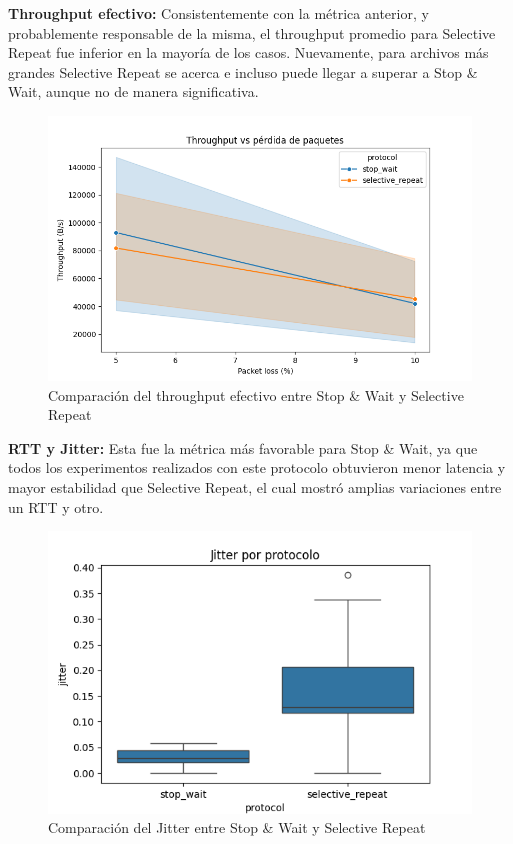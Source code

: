 \textbf{Throughput efectivo:}
Consistentemente con la métrica anterior, y probablemente responsable de la misma, el throughput promedio para Selective Repeat fue inferior en la mayoría de los casos. Nuevamente, para archivos más grandes Selective Repeat se acerca e incluso puede llegar a superar a Stop \& Wait, aunque no de manera significativa.
\begin{figure}[H]
    \centering
    \includegraphics[width=1\linewidth]{images/download_receiver_throughput_loss (1).png}
    \caption{Comparación del throughput efectivo entre Stop \& Wait y Selective Repeat}
    \label{fig:throughput_comparison}
\end{figure}

\textbf{RTT y Jitter:}
Esta fue la métrica más favorable para Stop \& Wait, ya que todos los experimentos realizados con este protocolo obtuvieron menor latencia y mayor estabilidad que Selective Repeat, el cual mostró amplias variaciones entre un RTT y otro.
\begin{figure}[H]
    \centering
    \includegraphics[width=1\linewidth]{images/server_sender_jitter.png}
    \caption{Comparación del Jitter entre Stop \& Wait y Selective Repeat}
    \label{fig:jitter_comparison}
\end{figure}

